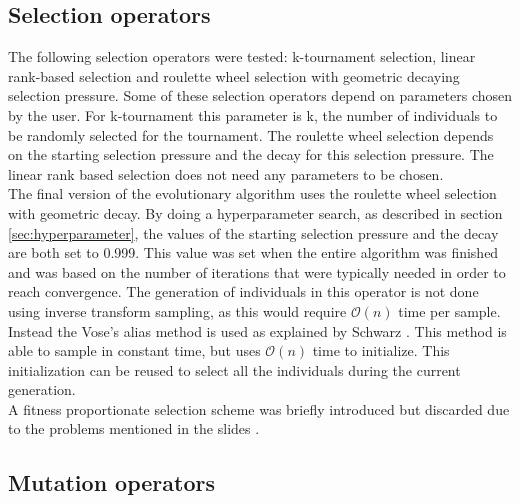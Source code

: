 \documentclass[a4paper,10pt]{article}
\newcommand{\ReplaceMe}[1]{{\color{blue}#1}}
\begin{document}
\subsection{Selection operators}


The following selection operators were tested: k-tournament selection, linear rank-based selection and roulette wheel selection with geometric decaying selection pressure. Some of these selection operators depend on parameters chosen by the user. For k-tournament this parameter is k, the number of individuals to be randomly selected for the tournament. The roulette wheel selection depends on the starting selection pressure and the decay for this selection pressure. The linear rank based selection does not need any parameters to be chosen.\\
The final version of the evolutionary algorithm uses the roulette wheel selection with geometric decay. By doing a hyperparameter search, as described in section \ref{sec:hyperparameter}, the values of the starting selection pressure and the decay are both set to 0.999. This value was set when the entire algorithm was finished and was based on the number of iterations that were typically needed in order to reach convergence. The generation of individuals in this operator is not done using inverse transform sampling, as this would require $\mathcal{O}(n)$ time per sample. Instead the Vose's alias method is used as explained by Schwarz \cite{schwarz, vose}. This method is able to sample in constant time, but uses $\mathcal{O}(n)$ time to initialize. This initialization can be reused to select all the individuals during the current generation.\\
A fitness proportionate selection scheme was briefly introduced but discarded due to the problems mentioned in the slides \cite{slides}.

\subsection{Mutation operators} \label{sec:mutation}

\end{document}

